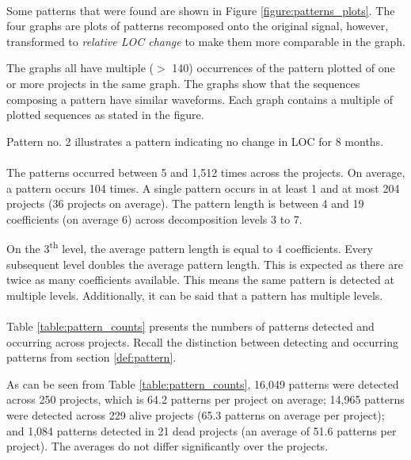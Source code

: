 \paragraph{}
Some patterns that were found are shown in Figure \ref{figure:patterns_plots}.
The four graphs are plots of patterns recomposed onto the original signal,
however, transformed to \textit{relative LOC change} to make them more
comparable in the graph.

The graphs all have multiple ($>$ 140) occurrences of the pattern plotted of one
or more projects in the same graph. The graphs show that the sequences
composing a pattern have similar waveforms. Each graph contains a multiple of
plotted sequences as stated in the figure.



\noindent
Pattern no. 2 illustrates a pattern indicating no change in LOC for 8 months.

\paragraph{}
The patterns occurred between 5 and 1,512 times across the projects. On
average, a pattern occurs 104 times. A single pattern occurs in at least 1 and
at most 204 projects (36 projects on average). The pattern length is between 4
and 19 coefficients (on average 6) across decomposition levels 3 to 7.

On the 3\textsuperscript{th} level, the average pattern length is equal to 4
coefficients. Every subsequent level doubles the average pattern length. This
is expected as there are twice as many coefficients available. This means the
same pattern is detected at multiple levels. Additionally, it can be said that
a pattern has multiple levels.

\paragraph{}
Table \ref{table:pattern_counts} presents the numbers of patterns
detected and occurring across projects. Recall the distinction between
detecting and occurring patterns from section \ref{def:pattern}.



\noindent
As can be seen from Table \ref{table:pattern_counts}, 16,049 patterns were
detected across 250 projects, which is 64.2 patterns per project on average;
14,965 patterns were detected across 229 alive projects (65.3 patterns on
average per project); and 1,084 patterns detected in 21 dead projects (an
average of 51.6 patterns per project). The averages do not differ significantly
over the projects.



